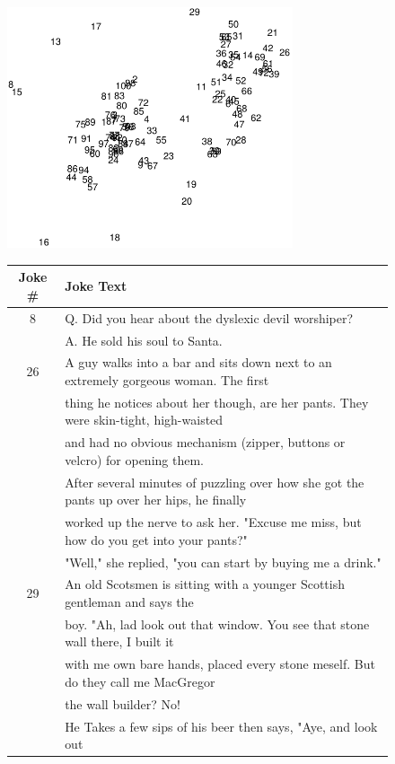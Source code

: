 \documentclass{article} %
\begin{document}
\begin{figure} [h]
\centering
\includegraphics[width = 0.75\textwidth]{jokes_2d.pdf}
\begin{tabular}{c | l}
\hline \hline
Joke \# & Joke Text \\ \hline
  8     & Q. Did you hear about 
the dyslexic devil worshiper? \\
        & A. He sold his soul to Santa.\\ \hline
  26 & A guy walks into a bar and sits down next to an extremely
       gorgeous woman. The first \\
     & thing he notices about her though, are her pants. They were
       skin-tight, high-waisted \\
     & and had no obvious mechanism (zipper, buttons or velcro) for opening them. \\
     & After several minutes of puzzling over how she got the pants up over
       her hips, he finally \\
     & worked up the nerve to ask her. "Excuse me miss, but how do you get into your pants?" \\ 
     & "Well," she replied, "you can start by buying me a drink."\\ \hline
  29 & An old Scotsmen is sitting with a younger Scottish gentleman
       and says the \\
     &  boy. "Ah, lad look out that window. You see that stone wall
       there, I built it \\
     & with me own bare hands, placed every stone meself. But do they
       call me MacGregor \\
     & the wall builder? No! \\
     & He Takes a few sips of his beer then says, "Aye, and look out

\end{tabular}
\end{figure}
\end{document}

